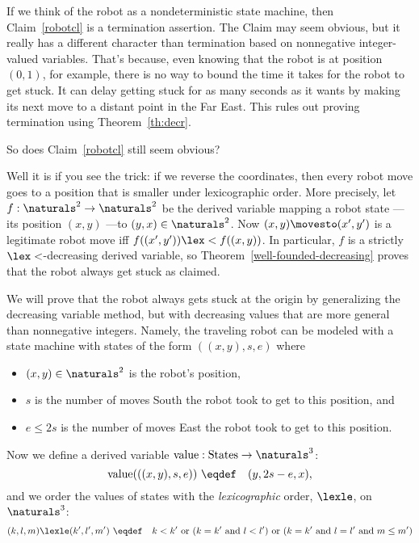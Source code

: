 If we think of the robot as a nondeterministic state machine, then
Claim~\ref{robotcl} is a termination assertion.  The Claim may seem
obvious, but it really has a different character than termination based on
nonnegative integer-valued variables.  That's because, even knowing that
the robot is at position $(0,1)$, for example, there is no way to bound
the time it takes for the robot to get stuck.  It can delay getting stuck
for as many seconds as it wants by making its next move to a distant point
in the Far East.  This rules out proving termination using
Theorem~\ref{th:decr}.

So does Claim~\ref{robotcl} still seem obvious?

Well it is if you see the trick: if we reverse the coordinates, then every
robot move goes to a position that is smaller under lexicographic order.
More precisely, let $f:\naturals^2 \to \naturals^2$ be the derived variable
mapping a robot state ---its position $(x,y)$ ---to $(y,x) \in
\naturals^2$.  Now $(x,y)\movesto (x',y')$ is a legitimate robot move iff
$f((x',y')) \lex< f((x,y))$.  In particular, $f$ is a strictly
$\lex<$-decreasing derived variable, so
Theorem~\ref{well-founded-decreasing} proves that the robot always get
stuck as claimed.
\fi



We will prove that the robot always gets stuck at the origin by
generalizing the decreasing variable method, but with decreasing values
that are more general than nonnegative integers.  Namely, the traveling robot
can be modeled with a state machine with states of the form $((x,y),s,e)$
where
\begin{itemize}
\item $(x,y) \in \naturals^2$ is the robot's position,
\item $s$ is the number of moves South the robot took to get to this
position, and
\item $e \le 2s$ is the number of moves East the robot took to get to this
position. 
\end{itemize}

Now we define a derived variable $\vl:\text{States}\to \naturals^3$:
\[
\vl(((x,y),s,e)) \ \eqdef\quad (y,2s-e,x),
\]
and we order the values of states with the \emph{lexicographic} order,
$\lexle$, on $\naturals^3$:
\begin{equation}\label{lex3}
(k,l,m) \lexle (k',l',m') \ \eqdef\quad k < k' \text{ or } (k=k' \text{
and } l < l') \text{ or } (k=k' \text{ and } l = l' \text{ and } m \le m')
\end{equation}

